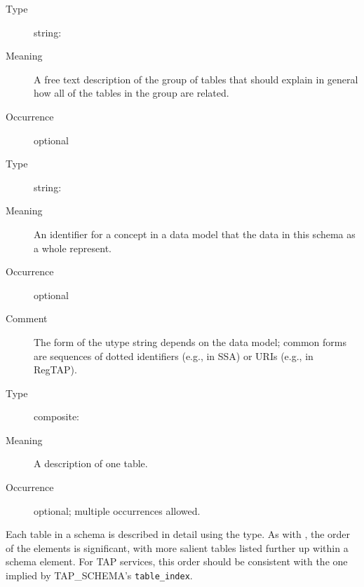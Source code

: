 \documentclass[11pt,a4paper]{ivoa}
\begin{document}
\begin{generated}
\begin{bigdescription}
\begin{description}
\end{description}
\item[Element \xmlel{description}]
\begin{description}
\item[Type] string: 
\item[Meaning] A free text description of the group of tables that should
               explain in general how all of the tables in the group are
               related.
\item[Occurrence] optional

\end{description}
\item[Element \xmlel{utype}]
\begin{description}
\item[Type] string: 
\item[Meaning] An identifier for a concept in a data model that
                  the data in this schema as a whole represent.
\item[Occurrence] optional
\item[Comment] The form of the utype string depends on the data
                  model; common forms are sequences of dotted identifiers
                  (e.g., in SSA) or URIs (e.g., in RegTAP).

\end{description}
\item[Element \xmlel{table}]
\begin{description}
\item[Type] composite: 
\item[Meaning] A description of one table.
\item[Occurrence] optional; multiple occurrences allowed.

\end{description}


\end{bigdescription}\endgroup

\endgroup
\end{generated}



Each table in a schema is described in detail using the
 type.
As with , the order of the  elements is
significant, with more salient tables listed further up within a schema
element.  For TAP services, this order should be consistent with the one
implied by TAP\_SCHEMA's \verb|table_index|.
\end{document}
